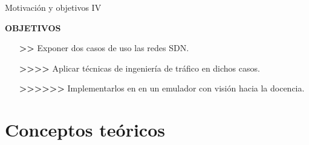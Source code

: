\documentclass[10pt,spanish,xcolor={svgnames}]{beamer}
\begin{document}
\begin{frame}{Motivación y objetivos IV}
\vspace*{-2em}
\begin{alertblock}{\LARGE\textbf{OBJETIVOS}}
\large
\begin{itemize}

	\vspace{1.2em}
	
    \item[\textbf{>>}] Exponer dos casos de uso las redes SDN.
	
    \vspace{1.3em}
    
    \item[\textbf{>>>>}] Aplicar técnicas de ingeniería de tráfico en dichos casos.
    
    \vspace{1em}
	
    \item[\textbf{>>>>>>}] Implementarlos en en un emulador con visión hacia la docencia.
\end{itemize}
\end{alertblock}
\end{frame}


\section{Conceptos teóricos}


\end{document}
